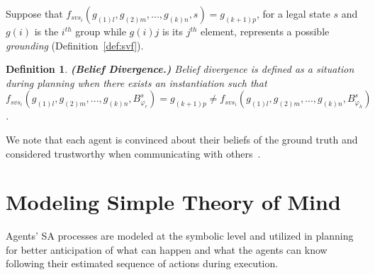 \documentclass[letterpaper]{article} %
\newtheorem{definition}{Definition}
\begin{document}
Suppose that 
$f_{\textit{svs}_i}(g_{(1)l},g_{(2)m},...,g_{(k)n},s) = g_{(k+1)p}$, for a legal state $s$ and $g(i)$ is the $i^{th}$ group while $g(i)j$ is its $j^{th}$ element, represents a possible {\em grounding} (Definition~\ref{def:svf}).

\begin{definition} \label{def:bd}
\textbf{(Belief Divergence.)}
Belief divergence is defined as a situation during planning when there exists an instantiation such that 
$f_{\textit{svs}_i}(g_{(1)l},g_{(2)m},...,g_{(k)n},B_{\varphi_r}^s) = {g_{(k+1)p}}  \neq f_{\textit{svs}_i}(g_{(1)l},g_{(2)m},...,g_{(k)n},B_{\varphi_h}^s)$.
\end{definition} 

We note that each agent is convinced about their beliefs of the ground truth and considered trustworthy when communicating with others~\cite{fabiano2021multi}.

\section{Modeling Simple Theory of Mind}
Agents' SA processes are modeled at the symbolic level and utilized in planning for better anticipation of what can happen and what the agents can know following their estimated sequence of actions during execution. 

\end{document}
